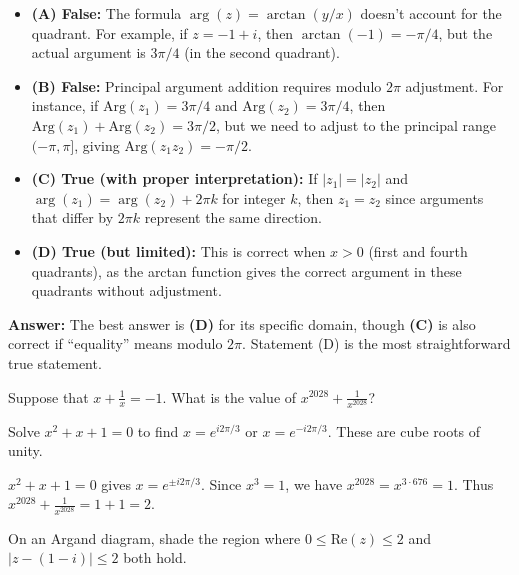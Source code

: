 \begin{solution}[Sketch]
\begin{itemize}[leftmargin=*]
  \item \textbf{(A) False:} The formula $\arg(z) = \arctan(y/x)$ doesn't account for the quadrant. For example, if $z = -1 + i$, then $\arctan(-1) = -\pi/4$, but the actual argument is $3\pi/4$ (in the second quadrant).
  
  \item \textbf{(B) False:} Principal argument addition requires modulo $2\pi$ adjustment. For instance, if $\text{Arg}(z_1) = 3\pi/4$ and $\text{Arg}(z_2) = 3\pi/4$, then $\text{Arg}(z_1) + \text{Arg}(z_2) = 3\pi/2$, but we need to adjust to the principal range $(-\pi, \pi]$, giving $\text{Arg}(z_1 z_2) = -\pi/2$.
  
  \item \textbf{(C) True (with proper interpretation):} If $|z_1| = |z_2|$ and $\arg(z_1) = \arg(z_2) + 2\pi k$ for integer $k$, then $z_1 = z_2$ since arguments that differ by $2\pi k$ represent the same direction.
  
  \item \textbf{(D) True (but limited):} This is correct when $x > 0$ (first and fourth quadrants), as the arctan function gives the correct argument in these quadrants without adjustment.
\end{itemize}

\textbf{Answer:} The best answer is \textbf{(D)} for its specific domain, though \textbf{(C)} is also correct if ``equality'' means modulo $2\pi$. Statement (D) is the most straightforward true statement.
\end{solution}

\begin{problem}
Suppose that $x + \frac{1}{x} = -1$. What is the value of $x^{2028} + \frac{1}{x^{2028}}$?
\end{problem}

\begin{hint}
Solve $x^2 + x + 1 = 0$ to find $x = e^{i2\pi/3}$ or $x = e^{-i2\pi/3}$. These are cube roots of unity.
\end{hint}

\begin{solution}[Sketch]
$x^2+x+1=0$ gives $x = e^{\pm i2\pi/3}$. Since $x^3=1$, we have $x^{2028} = x^{3 \cdot 676} = 1$. Thus $x^{2028} + \frac{1}{x^{2028}} = 1 + 1 = 2$.
\end{solution}

\begin{problem}
On an Argand diagram, shade the region where $0 \le \text{Re}(z) \le 2$ and $|z - (1-i)| \le 2$ both hold.
\end{problem}

